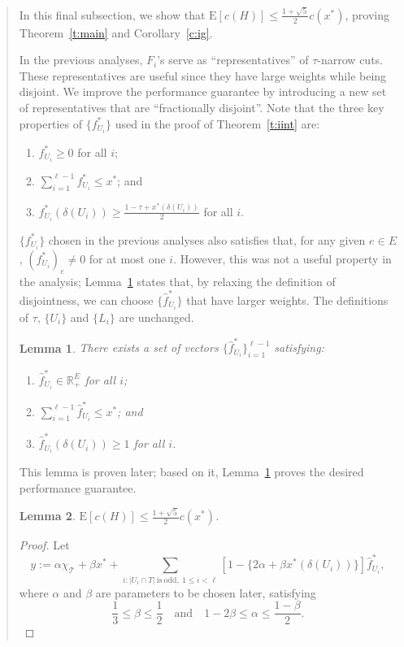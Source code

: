 \documentclass[11pt,letterpaper]{article}
\newtheorem{lemma}{Lemma}
\newcommand{\E}{\mathrm{E}}
\begin{document}
\begin{quote}
In this final subsection, we show that $\E[c(H)]\leq\frac{1+\sqrt{5}}{2}c(x^*)$, proving Theorem~\ref{t:main} and Corollary~\ref{c:ig}.

In the previous analyses, $F_i$'s serve as ``representatives'' of $\tau$-narrow cuts. These representatives are useful since they have large weights while being disjoint. We improve the performance guarantee by introducing a new set of representatives that are ``fractionally disjoint''. Note that the three key properties of $\{f^*_{U_i}\}$ used in the proof of Theorem~\ref{t:iint} are:\begin{enumerate}
\item $f^*_{U_i}\geq 0$ for all $i$;
\item $\sum_{i=1}^{\ell-1} f^*_{U_i} \leq x^*$; and
\item $f^*_{U_i}(\delta(U_i))\geq \frac{1-\tau+x^*(\delta(U_i))}{2}$ for all $i$.
\end{enumerate}
$\{f^*_{U_i}\}$ chosen in the previous analyses also satisfies that, for any given $e\in E$, $\left(f^*_{U_i}\right)_e \neq 0$ for at most one $i$. However, this was not a useful property in the analysis; Lemma~\ref{l:fd} states that, by relaxing the definition of disjointness, we can choose $\{\hat f ^*_{U_i}\}$ that have larger weights. The definitions of $\tau$, $\{U_i\}$ and $\{L_i\}$ are unchanged.

\begin{lemma}
\label{l:fd}
There exists a set of vectors $\{\hat f _{U_i}^*\}_{i=1}^{\ell-1}$ satisfying:\begin{enumerate}
\item $\hat f _{U_i}^*\in\mathbb{R}_+^E$ for all $i$;
\item $\sum_{i=1}^{\ell-1} \hat f _{U_i}^* \leq x^*$; and
\item $\hat f _{U_i}^*(\delta(U_i))\geq 1$ for all $i$.
\end{enumerate}
\end{lemma}

This lemma is proven later; based on it, Lemma~\ref{l:fd} proves the desired performance guarantee.

\begin{lemma}\label{l:fin}
$\E[c(H)]\leq\frac{1+\sqrt{5}}{2}c(x^*)$.
\end{lemma}
\begin{proof}
Let\[
y:=\alpha\chi_{\mathscr{T}}+\beta x^*+\sum_{i:|U_i \cap T|\mathrm{~is~odd,~}1\leq i<\ell} \left[1-\{2\alpha+\beta x^*(\delta(U_i))\}\right]\hat f ^*_{U_i}
,\]where $\alpha$ and $\beta$ are parameters to be chosen later, satisfying\begin{equation}\label{e:later1}
\frac{1}{3}\leq \beta\leq\frac{1}{2} \quad\textrm{and}\quad 1-2\beta\leq\alpha\leq\frac{1-\beta}{2}
.\end{equation}


\end{proof}
\end{quote}
\end{document}
